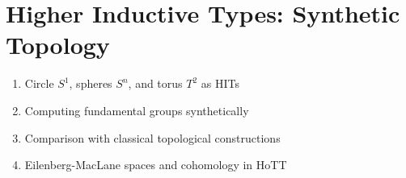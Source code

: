 \section{Higher Inductive Types: Synthetic Topology}\label{sec:hit}

\begin{enumerate}
    \item Circle $S^1$, spheres $S^n$, and torus $T^2$ as HITs
    \item Computing fundamental groups synthetically
    \item Comparison with classical topological constructions
    \item Eilenberg-MacLane spaces and cohomology in HoTT
\end{enumerate}
